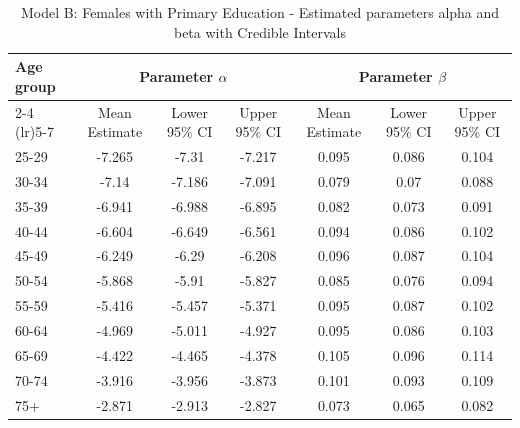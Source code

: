 \begin{landscape}
\begin{table}[htbp]
\centering
\caption{Model B: Females with Primary Education - Estimated parameters alpha and beta  with Credible Intervals}
\label{tab:parameters_ab10}
\begin{tabular}{@{}lcccccc@{}}
\toprule
Age group & \multicolumn{3}{c}{Parameter \(\alpha\)} & \multicolumn{3}{c}{Parameter \(\beta\)} \\ 
\cmidrule(lr){2-4} \cmidrule(lr){5-7}
          & Mean Estimate & Lower 95\% CI & Upper 95\% CI & Mean Estimate & Lower 95\% CI & Upper 95\% CI \\ 
\midrule
25-29 & -7.265 & -7.31 & -7.217 & 0.095 & 0.086 & 0.104 \\
30-34 & -7.14 & -7.186 & -7.091 & 0.079 & 0.07 & 0.088 \\
35-39 & -6.941 & -6.988 & -6.895 & 0.082 & 0.073 & 0.091 \\
40-44 & -6.604 & -6.649 & -6.561 & 0.094 & 0.086 & 0.102 \\
45-49 & -6.249 & -6.29 & -6.208 & 0.096 & 0.087 & 0.104 \\
50-54 & -5.868 & -5.91 & -5.827 & 0.085 & 0.076 & 0.094 \\
55-59 & -5.416 & -5.457 & -5.371 & 0.095 & 0.087 & 0.102 \\
60-64 & -4.969 & -5.011 & -4.927 & 0.095 & 0.086 & 0.103 \\
65-69 & -4.422 & -4.465 & -4.378 & 0.105 & 0.096 & 0.114 \\
70-74 & -3.916 & -3.956 & -3.873 & 0.101 & 0.093 & 0.109 \\
75+ & -2.871 & -2.913 & -2.827 & 0.073 & 0.065 & 0.082 \\
\bottomrule
\end{tabular}
\end{table}
\end{landscape}
